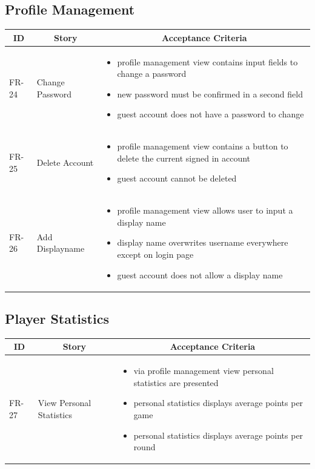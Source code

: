 \subsection{Profile Management}
\begin{tabular} { | m{1.25cm} | m{5.75cm} | m{6cm} | }
    \hline
    \multicolumn{1}{|c|}{ \textbf{ID}} & \multicolumn{1}{|c|}{ \textbf{Story} } & \multicolumn{1}{|c|}{ \textbf{Acceptance Criteria} } \\
    \hline
    FR-24 & Change Password & \begin{itemize}[-]
        \item profile management view contains input fields to change a password
        \item new password must be confirmed in a second field
        \item guest account does not have a password to change
    \end{itemize}\\
    \hline
    FR-25 & Delete Account & \begin{itemize}[-]
        \item profile management view contains a button to delete the current signed in account
        \item guest account cannot be deleted
    \end{itemize} \\
    \hline
    FR-26 & Add Displayname & \begin{itemize}[-]
        \item profile management view allows user to input a display name
        \item display name overwrites username everywhere except on login page
        \item guest account does not allow a display name
    \end{itemize}\\
    \hline
\end{tabular}

\subsection{Player Statistics}
\begin{tabular} { | m{1.25cm} | m{5.75cm} | m{6cm} | }
    \hline
    \multicolumn{1}{|c|}{ \textbf{ID}} & \multicolumn{1}{|c|}{ \textbf{Story} } & \multicolumn{1}{|c|}{ \textbf{Acceptance Criteria} } \\
    \hline
    FR-27 & View Personal Statistics & \begin{itemize}[-]
        \item via profile management view personal statistics are presented
        \item personal statistics displays average points per game
        \item personal statistics displays average points per round
    \end{itemize}\\
    \hline
\end{tabular}

